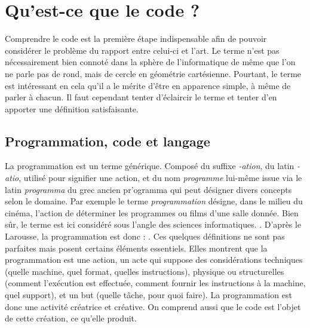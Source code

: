 \documentclass[12pt]{article} %
\begin{document}
\section{Qu'est-ce que le code ?}
Comprendre le code est la première étape indispensable afin de pouvoir considérer le problème du rapport entre celui-ci et l'art. Le terme n'est pas nécessairement bien connoté dans la sphère de l'informatique de même que l'on ne parle pas de rond, mais de cercle en géométrie cartésienne. Pourtant, le terme est intéressant en cela qu'il a le mérite d'être en apparence simple, à même de parler à chacun. Il faut cependant tenter d'éclaircir le terme et tenter d'en apporter une définition satisfaisante.

\subsection{Programmation, code et langage}
La programmation est un terme générique. Composé du suffixe \textit{-ation}, du latin \textit{-atio}, utilisé pour signifier une action, et du nom \textit{programme} lui-même issue via le latin \textit{programma} du grec ancien \textgreek{pr'ogramma} qui peut désigner divers concepts selon le domaine. Par exemple le terme \textit{programmation} désigne, dans le milieu du cinéma, l'action de déterminer les programmes ou films d'une salle donnée. Bien sûr, le terme est ici considéré sous l'angle des sciences informatiques.  \cite{Romero2017-mk}. D'après le Larousse, la programmation est donc : 
\cite{Nimmo2017-ya}. Ces quelques définitions ne sont pas parfaites mais posent certains éléments essentiels. Elles montrent que la programmation est une action, un acte qui suppose des considérations techniques (quelle machine, quel format, quelles instructions), physique ou structurelles (comment l'exécution est effectuée, comment fournir les instructions à la machine, quel support), et un but (quelle tâche, pour quoi faire). La programmation est donc une activité créatrice et créative. On comprend aussi que le code est l'objet de cette création, ce qu'elle produit.
\end{document}
